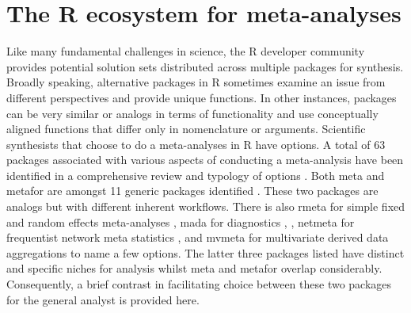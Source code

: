 \section{The R ecosystem for meta-analyses}
Like many fundamental challenges in science, the R developer community provides potential solution sets distributed across multiple packages for synthesis.  Broadly speaking, alternative packages in R sometimes examine an issue from different perspectives and provide unique functions.  In other instances, packages can be very similar or analogs in terms of functionality and use conceptually aligned functions that differ only in nomenclature or arguments.  Scientific synthesists that choose to do a meta-analyses in R have options.  A total of 63 packages associated with various aspects of conducting a meta-analysis have been identified in a comprehensive review and typology of options \citep{RN6178}.  Both meta \citep{RN6176} and metafor \citep{RN6175} are amongst 11 generic packages identified \citep{RN6178}.  These two packages are analogs but with different inherent workflows.  There is also rmeta for simple fixed and random effects meta-analyses \citep{RN6195}, mada for diagnostics \citep{RN6196}, \citep{RN6196}, netmeta for frequentist network meta statistics \citep{RN6197}, and mvmeta for multivariate derived data aggregations \citep{RN6198} to name a few options.  The latter three packages listed have distinct and specific niches for analysis whilst meta and metafor overlap considerably.  Consequently, a brief contrast in facilitating choice between these two packages for the general analyst is provided here.


